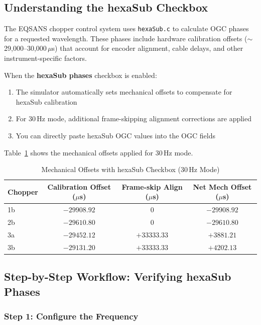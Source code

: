 \documentclass[11pt,letterpaper]{article}
\begin{document}
\subsection{Understanding the hexaSub Checkbox}

The EQSANS chopper control system uses \texttt{hexaSub.c} to calculate OGC phases for a requested 
wavelength. These phases include hardware calibration offsets ($\sim$29,000--30,000\,$\mu$s) that 
account for encoder alignment, cable delays, and other instrument-specific factors.

When the \textbf{hexaSub phases} checkbox is enabled:
\begin{enumerate}
    \item The simulator automatically sets mechanical offsets to compensate for hexaSub calibration
    \item For 30\,Hz mode, additional frame-skipping alignment corrections are applied
    \item You can directly paste hexaSub OGC values into the OGC fields
\end{enumerate}

Table~\ref{tab:hexasub_offsets} shows the mechanical offsets applied for 30\,Hz mode.

\begin{table}[h]
\centering
\caption{Mechanical Offsets with hexaSub Checkbox (30\,Hz Mode)}
\label{tab:hexasub_offsets}
\begin{tabular}{lccc}
\toprule
Chopper & Calibration Offset ($\mu$s) & Frame-skip Align ($\mu$s) & Net Mech Offset ($\mu$s) \\
\midrule
1b & $-29908.92$ & $0$ & $-29908.92$ \\
2b & $-29610.80$ & $0$ & $-29610.80$ \\
3a & $-29452.12$ & $+33333.33$ & $+3881.21$ \\
3b & $-29131.20$ & $+33333.33$ & $+4202.13$ \\
\bottomrule
\end{tabular}
\end{table}

\subsection{Step-by-Step Workflow: Verifying hexaSub Phases}

\subsubsection{Step 1: Configure the Frequency}
\end{document}
